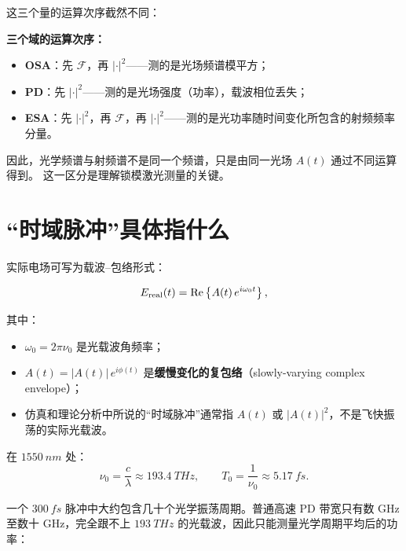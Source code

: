 \documentclass[11pt,a4paper]{article}
\newcommand{\FT}{\mathcal{F}}
\begin{document}
这三个量的运算次序截然不同：

\begin{center}
\begin{tcolorbox}[width=0.92\textwidth, colback=blue!3, colframe=blue!40]
\textbf{三个域的运算次序：}
\begin{itemize}
    \item \textbf{OSA}：先 $\FT$，再 $|\cdot|^2$——测的是光场频谱模平方；
    \item \textbf{PD}：先 $|\cdot|^2$——测的是光场强度（功率），载波相位丢失；
    \item \textbf{ESA}：先 $|\cdot|^2$，再 $\FT$，再 $|\cdot|^2$——测的是光功率随时间变化所包含的射频频率分量。
\end{itemize}
\end{tcolorbox}
\end{center}

因此，光学频谱与射频谱不是同一个频谱，只是由同一光场 $A(t)$ 通过不同运算得到。
这一区分是理解锁模激光测量的关键。

\section{“时域脉冲”具体指什么}

实际电场可写为载波--包络形式：

\begin{equation}\label{eq:real_field}
E_{\rm real}(t)
= \operatorname{Re}\left\{A(t)\,e^{i\omega_0 t}\right\},
\end{equation}

其中：
\begin{itemize}
    \item $\omega_0 = 2\pi\nu_0$ 是光载波角频率；
    \item $A(t) = |A(t)|\,e^{i\phi(t)}$ 是\textbf{缓慢变化的复包络}（slowly-varying complex envelope）；
    \item 仿真和理论分析中所说的“时域脉冲”通常指 $A(t)$ 或 $|A(t)|^2$，不是飞快振荡的实际光载波。
\end{itemize}

在 $\SI{1550}{nm}$ 处：
\begin{equation}\label{eq:carrier_numbers}
\nu_0 = \frac{c}{\lambda} \approx \SI{193.4}{THz},
\qquad
T_0 = \frac{1}{\nu_0} \approx \SI{5.17}{fs}.
\end{equation}

一个 $\SI{300}{fs}$ 脉冲中大约包含几十个光学振荡周期。普通高速 PD 带宽只有数 GHz
至数十 GHz，完全跟不上 $\SI{193}{THz}$ 的光载波，因此只能测量光学周期平均后的功率：
\end{document}
